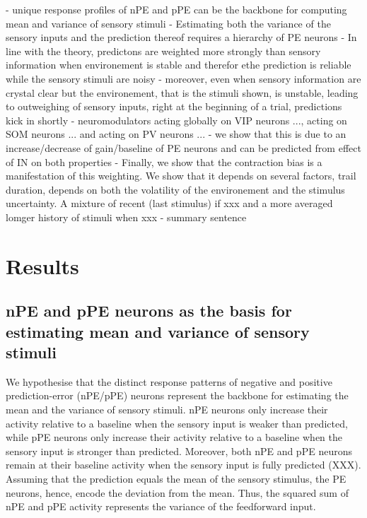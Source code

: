 \documentclass[10pt,a4paper,draft]{article}
\begin{document}
- unique response profiles of nPE and pPE can be the backbone for computing mean and variance of sensory stimuli
- Estimating both the variance of the sensory inputs and the prediction thereof requires a hierarchy of PE neurons
- In line with the theory, predictons are weighted more strongly than sensory information when environement is stable and therefor ethe prediction is reliable while the sensory stimuli are noisy
- moreover, even when sensory information are crystal clear but the environement, that is the stimuli shown, is unstable, leading to outweighing of sensory inputs, right at the beginning of  a trial, predictions kick in shortly
- neuromodulators acting globally on VIP neurons ..., acting on SOM neurons ... and acting on PV neurons ...
- we show that this is due to an increase/decrease of gain/baseline of PE neurons and can be predicted from effect of IN on both properties
- Finally, we show that the contraction bias is a manifestation of this weighting. We show that it depends on several factors, trail duration, depends on both the volatility of the environement and the stimulus uncertainty. A mixture of recent (last stimulus) if xxx and a more averaged lomger history of stimuli when xxx
- summary sentence


\section*{Results}
%

\subsection*{nPE and pPE neurons as the basis for estimating mean and variance of sensory stimuli}
%
We hypothesise that the distinct response patterns of negative and positive prediction-error (nPE/pPE) neurons represent the backbone for estimating the mean and the variance of sensory stimuli. nPE neurons only increase their activity relative to a baseline when the sensory input is weaker than predicted, while pPE neurons only increase their activity relative to a baseline when the sensory input is stronger than predicted. Moreover, both nPE and pPE neurons remain at their baseline activity when the sensory input is fully predicted (XXX). Assuming that the prediction equals the mean of the sensory stimulus, the PE neurons, hence, encode the deviation from the mean. Thus, the squared sum of nPE and pPE activity represents the variance of the feedforward input. 
\end{document}
